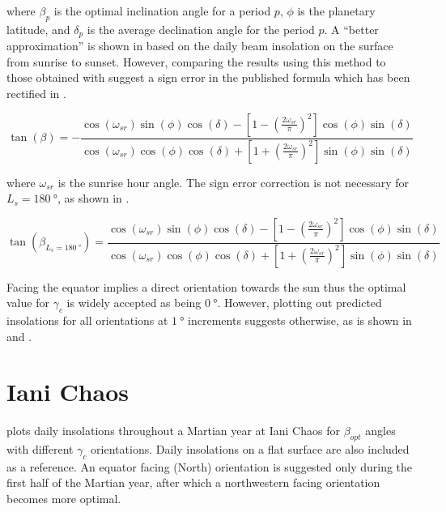 where $\beta_{p}$ is the optimal inclination angle for a period $p$, $\phi$ is the planetary latitude, and $\delta_{p}$ is the average declination angle for the period $p$. A ``better approximation'' is shown in  based on the daily beam insolation on the surface from sunrise to sunset. However, comparing the results using this method to those obtained with  suggest a sign error in the published formula which has been rectified in .

\begin{equation}
  \label{eq:optimal_tanbeta_insolation}
  \tan{(\beta)} = -\frac{\cos{(\omega_{sr})}\sin{(\phi)}\cos{(\delta)}-\left[1-\left(\frac{2\omega_{sr}}{\pi}\right)^{2}\right]\cos{(\phi)}\sin{(\delta)}}{\cos{(\omega_{sr})}\cos{(\phi)}\cos{(\delta)}+\left[1+\left(\frac{2\omega_{sr}}{\pi}\right)^{2}\right]\sin{(\phi)}\sin{(\delta)}}
\end{equation}


where $\omega_{sr}$ is the sunrise hour angle. The sign error correction is not necessary for $L_{s} = \SI{180}{\degree}$, as shown in .

\begin{equation}
  \label{eq:optimal_tanbeta_insolation_Ls180}
  \tan{(\beta_{L_{s} = \SI{180}{\degree}})} = \frac{\cos{(\omega_{sr})}\sin{(\phi)}\cos{(\delta)}-\left[1-\left(\frac{2\omega_{sr}}{\pi}\right)^{2}\right]\cos{(\phi)}\sin{(\delta)}}{\cos{(\omega_{sr})}\cos{(\phi)}\cos{(\delta)}+\left[1+\left(\frac{2\omega_{sr}}{\pi}\right)^{2}\right]\sin{(\phi)}\sin{(\delta)}}
\end{equation}

Facing the equator implies a direct orientation towards the sun thus the optimal value for $\gamma_{c}$ is widely accepted as being $\SI{0}{\degree}$. However, plotting out predicted insolations for all orientations at $\SI{1}{\degree}$ increments suggests otherwise, as is shown in  and .

\section{Iani Chaos}
\label{sec:Appendix:OptimalAngles:IaniChaos}

 plots daily insolations throughout a Martian year at Iani Chaos for $\beta_{opt}$ angles with different $\gamma_{c}$ orientations. Daily insolations on a flat surface are also included as a reference. An equator facing (North) orientation is suggested only during the first half of the Martian year, after which a northwestern facing orientation becomes more optimal.

